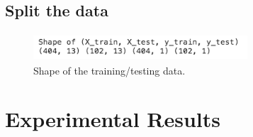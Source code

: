 \documentclass[conference]{IEEEtran}
\begin{document}
\subsection{Split the data}
\begin{figure}[htbp]
\centerline{\includegraphics[width=8cm, height=1cm]{4.png}}
\caption{Shape of the training/testing data.}
\label{4}
\end{figure}




\section{Experimental Results}
\end{document}
